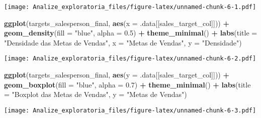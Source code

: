 \documentclass[
]{article}
\newenvironment{Shaded}{\begin{snugshade}}{\end{snugshade}}
\newcommand{\AttributeTok}[1]{\textcolor[rgb]{0.13,0.29,0.53}{#1}}
\newcommand{\FloatTok}[1]{\textcolor[rgb]{0.00,0.00,0.81}{#1}}
\newcommand{\FunctionTok}[1]{\textcolor[rgb]{0.13,0.29,0.53}{\textbf{#1}}}
\newcommand{\NormalTok}[1]{#1}
\newcommand{\SpecialCharTok}[1]{\textcolor[rgb]{0.81,0.36,0.00}{\textbf{#1}}}
\newcommand{\StringTok}[1]{\textcolor[rgb]{0.31,0.60,0.02}{#1}}
\begin{document}
\texttt{[image: Analize\_exploratoria\_files/figure-latex/unnamed-chunk-6-1.pdf]}

\begin{Shaded}
\begin{Highlighting}[]
\FunctionTok{ggplot}\NormalTok{(targets\_salesperson\_final, }\FunctionTok{aes}\NormalTok{(}\AttributeTok{x =}\NormalTok{ .data[[sales\_target\_col]])) }\SpecialCharTok{+}
  \FunctionTok{geom\_density}\NormalTok{(}\AttributeTok{fill =} \StringTok{"blue"}\NormalTok{, }\AttributeTok{alpha =} \FloatTok{0.5}\NormalTok{) }\SpecialCharTok{+}
  \FunctionTok{theme\_minimal}\NormalTok{() }\SpecialCharTok{+}
  \FunctionTok{labs}\NormalTok{(}\AttributeTok{title =} \StringTok{"Densidade das Metas de Vendas"}\NormalTok{, }\AttributeTok{x =} \StringTok{"Metas de Vendas"}\NormalTok{, }\AttributeTok{y =} \StringTok{"Densidade"}\NormalTok{)}
\end{Highlighting}
\end{Shaded}

\texttt{[image: Analize\_exploratoria\_files/figure-latex/unnamed-chunk-6-2.pdf]}

\begin{Shaded}
\begin{Highlighting}[]
\FunctionTok{ggplot}\NormalTok{(targets\_salesperson\_final, }\FunctionTok{aes}\NormalTok{(}\AttributeTok{y =}\NormalTok{ .data[[sales\_target\_col]])) }\SpecialCharTok{+}
  \FunctionTok{geom\_boxplot}\NormalTok{(}\AttributeTok{fill =} \StringTok{"blue"}\NormalTok{, }\AttributeTok{alpha =} \FloatTok{0.7}\NormalTok{) }\SpecialCharTok{+}
  \FunctionTok{theme\_minimal}\NormalTok{() }\SpecialCharTok{+}
  \FunctionTok{labs}\NormalTok{(}\AttributeTok{title =} \StringTok{"Boxplot das Metas de Vendas"}\NormalTok{, }\AttributeTok{y =} \StringTok{"Metas de Vendas"}\NormalTok{)}
\end{Highlighting}
\end{Shaded}

\texttt{[image: Analize\_exploratoria\_files/figure-latex/unnamed-chunk-6-3.pdf]}
\end{document}
